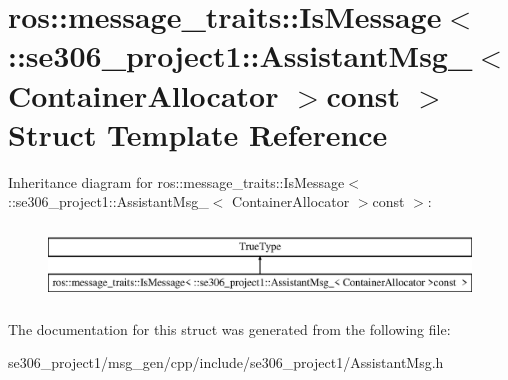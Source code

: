 \hypertarget{structros_1_1message__traits_1_1IsMessage_3_01_1_1se306__project1_1_1AssistantMsg___3_01ContainerAllocator_01_4const_01_01_4}{\section{ros\-:\-:message\-\_\-traits\-:\-:Is\-Message$<$ \-:\-:se306\-\_\-project1\-:\-:Assistant\-Msg\-\_\-$<$ Container\-Allocator $>$const $>$ Struct Template Reference}
\label{structros_1_1message__traits_1_1IsMessage_3_01_1_1se306__project1_1_1AssistantMsg___3_01ContainerAllocator_01_4const_01_01_4}
}
Inheritance diagram for ros\-:\-:message\-\_\-traits\-:\-:Is\-Message$<$ \-:\-:se306\-\_\-project1\-:\-:Assistant\-Msg\-\_\-$<$ Container\-Allocator $>$const $>$\-:\begin{figure}[H]
\begin{center}
\leavevmode
\includegraphics[height=1.992882cm]{structros_1_1message__traits_1_1IsMessage_3_01_1_1se306__project1_1_1AssistantMsg___3_01ContainerAllocator_01_4const_01_01_4}
\end{center}
\end{figure}


The documentation for this struct was generated from the following file\-:\begin{DoxyCompactItemize}
\item 
se306\-\_\-project1/msg\-\_\-gen/cpp/include/se306\-\_\-project1/Assistant\-Msg.\-h\end{DoxyCompactItemize}
